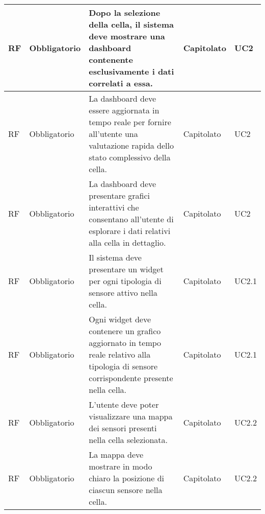 \begin{longtable}{|C{1cm}|C{2cm}|>{\raggedright}m{5cm}|C{2cm}|C{1.5cm}|}
    \hline
     RF & Obbligatorio        & Dopo la selezione della cella, il sistema deve mostrare una dashboard contenente esclusivamente i dati correlati a essa.                                                                                                           & Capitolato      & UC2               \\
    \hline
     RF & Obbligatorio        & La dashboard deve essere aggiornata in tempo reale per fornire all'utente una valutazione rapida dello stato complessivo della cella.                                                                                              & Capitolato      & UC2               \\
    \hline
     RF & Obbligatorio        & La dashboard deve presentare grafici interattivi che consentano all'utente di esplorare i dati relativi alla cella in dettaglio.                                                                                                   & Capitolato      & UC2               \\
    \hline
     RF & Obbligatorio        & Il sistema deve presentare un widget per ogni tipologia di sensore attivo nella cella.                                                                                                                                             & Capitolato      & UC2.1               \\
    \hline
     RF & Obbligatorio        & Ogni widget deve contenere un grafico aggiornato in tempo reale relativo alla tipologia di sensore corrispondente presente nella cella.                                                                                            & Capitolato      & UC2.1               \\
    \hline
     RF & Obbligatorio        & L'utente deve poter visualizzare una mappa dei sensori presenti nella cella selezionata.                                                                                                                                           & Capitolato      & UC2.2               \\
    \hline
     RF & Obbligatorio        & La mappa deve mostrare in modo chiaro la posizione di ciascun sensore nella cella.                                                                                                                                                 & Capitolato      & UC2.2               \\

\end{longtable}
